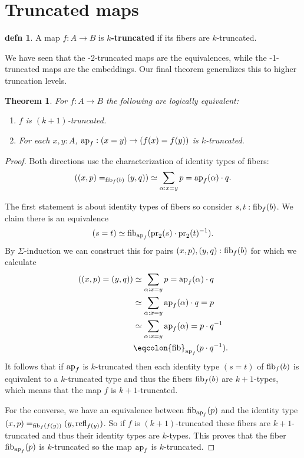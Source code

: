 \documentclass{amsart}
\theoremstyle{theorem}
\newtheorem*{thm}{Theorem}
\theoremstyle{definition}
\newtheorem*{defn}{defn}
\theoremstyle{remark}
\newcommand{\0}{\mathbbe{0}}
\newcommand{\1}{\mathbbe{1}}
\newcommand{\2}{\mathbbe{2}}
\newcommand{\3}{\mathbbe{3}}
\newcommand{\4}{\mathbbe{4}}
\newcommand{\term}[1]{{\textup{#1}}}
\newcommand{\type}[1]{{\textup{#1}}}
\newcommand{\pr}{\term{pr}}
\newcommand{\refl}{\term{refl}}
\newcommand{\ap}{\term{ap}}
\newcommand{\fib}{\type{fib}}
\begin{document}
\section*{Truncated maps}

\begin{defn} A map $f \colon A \to B$ is \textbf{$k$-truncated} if its fibers are $k$-truncated.
\end{defn}

We have seen that the -2-truncated maps are the equivalences, while the -1-truncated maps are the embeddings. Our final theorem generalizes this to higher truncation levels.

\begin{thm} For $f \colon A \to B$ the following are logically equivalent:
\begin{enumerate}
\item $f$ is $(k+1)$-truncated.
\item For each $x,y:A$, $\ap_f :(x=y) \to (f(x)=f(y))$ is $k$-truncated.
\end{enumerate}
\end{thm}
\begin{proof}
Both directions use the characterization of identity types of fibers:
\[ ((x,p) =_{\fib_f(b)}(y,q) ) \simeq \sum_{\alpha: x=y} p = \ap_f(\alpha) \cdot q.\]

The first statement is about identity types of fibers so consider $s,t : \fib_f(b)$.  We claim there is an equivalence \[ (s=t) \simeq \fib_{\ap_f}(\pr_2(s)\cdot \pr_2(t)^{-1}).\] By $\Sigma$-induction we can construct this for pairs $(x,p), (y,q) : \fib_f(b)$ for which we calculate
\begin{align*} ((x,p)=(y,q)) &\simeq \sum_{\alpha : x= y} p = \ap_f(\alpha)\cdot q  \\ &\simeq \sum_{\alpha:x=y} \ap_f(\alpha)\cdot q = p \\ &\simeq \sum_{\alpha :x=y} \ap_f(\alpha) = p \cdot q^{-1} \\
&\eqcolon \fib_{\ap_f}(p\cdot q{^{-1}}).
\end{align*}
It follows that if $\ap_f$ is $k$-truncated then each identity type $(s=t)$ of $\fib_f(b)$ is equivalent to a $k$-truncated type and thus the fibers $\fib_f(b)$ are $k+1$-types, which means that the map $f$ is $k+1$-truncated.

For the converse, we have an equivalence between $\fib_{\ap_f}(p)$ and the identity type $(x,p) =_{\fib_f(f(y))}(y,\refl_{f(y)})$. So if $f$ is $(k+1)$-truncated these fibers are $k+1$-truncated and thus  their identity types are $k$-types. This proves that the fiber $\fib_{\ap_f}(p)$ is $k$-truncated so the map $\ap_f$ is $k$-truncated.
\end{proof}
\end{document}
